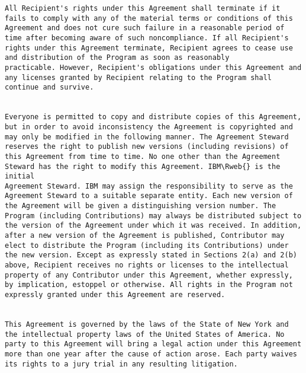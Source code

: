 \begin{verbatim}
All Recipient's rights under this Agreement shall terminate if it
fails to comply with any of the material terms or conditions of this
Agreement and does not cure such failure in a reasonable period of
time after becoming aware of such noncompliance. If all Recipient's
rights under this Agreement terminate, Recipient agrees to cease use
and distribution of the Program as soon as reasonably
practicable. However, Recipient's obligations under this Agreement and
any licenses granted by Recipient relating to the Program shall
continue and survive.  


Everyone is permitted to copy and distribute copies of this Agreement,
but in order to avoid inconsistency the Agreement is copyrighted and
may only be modified in the following manner. The Agreement Steward
reserves the right to publish new versions (including revisions) of
this Agreement from time to time. No one other than the Agreement
Steward has the right to modify this Agreement. IBM\Rweb{} is the initial
Agreement Steward. IBM may assign the responsibility to serve as the
Agreement Steward to a suitable separate entity. Each new version of
the Agreement will be given a distinguishing version number. The
Program (including Contributions) may always be distributed subject to
the version of the Agreement under which it was received. In addition,
after a new version of the Agreement is published, Contributor may
elect to distribute the Program (including its Contributions) under
the new version. Except as expressly stated in Sections 2(a) and 2(b)
above, Recipient receives no rights or licenses to the intellectual
property of any Contributor under this Agreement, whether expressly,
by implication, estoppel or otherwise. All rights in the Program not
expressly granted under this Agreement are reserved.  


This Agreement is governed by the laws of the State of New York and
the intellectual property laws of the United States of America. No
party to this Agreement will bring a legal action under this Agreement
more than one year after the cause of action arose. Each party waives
its rights to a jury trial in any resulting litigation.  


\end{verbatim}

